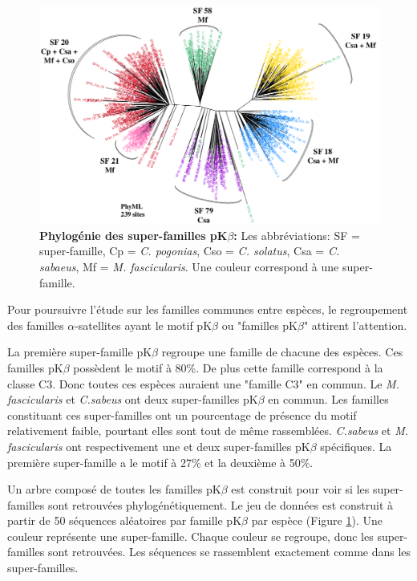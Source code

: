 \documentclass[12pt,a4paper]{article}
\begin{document}
	\begin{figure}	
			\centering
				\includegraphics[scale=0.4]{img/pkb_tree.png}				
				\caption{\textbf{Phylogénie des super-familles pK$\beta$:} Les abbréviations: SF = super-famille, Cp = \textit{C. pogonias}, Cso = \textit{C. solatus}, Csa = \textit{C. sabaeus}, Mf = \textit{M. fascicularis}. Une couleur correspond à une super-famille. 
	\label{fig:pkb_tree}} 
	\end{figure}

	Pour poursuivre l'étude sur les familles communes entre espèces, le regroupement des familles $\alpha$-satellites ayant  le motif pK$\beta$ ou "familles pK$\beta$" attirent l'attention. 
	
	La première super-famille pK$\beta$ regroupe une famille de chacune des espèces. Ces familles pK$\beta$ possèdent le motif à 80\%. De plus cette famille correspond à la classe C3. Donc toutes ces espèces auraient une "famille C3" en commun. Le \textit{M. fascicularis} et \textit{C.sabeus} ont deux super-familles pK$\beta$ en commun. Les familles constituant ces super-familles ont un pourcentage de présence du motif relativement faible, pourtant elles sont tout de même rassemblées.  \textit{C.sabeus} et \textit{M. fascicularis} ont respectivement une et deux super-familles pK$\beta$ spécifiques. La première super-famille a le motif à 27\% et la deuxième à 50\%.
		
	Un arbre composé de toutes les familles pK$\beta$ est construit pour voir si les super-familles sont retrouvées phylogénétiquement. Le jeu de données est construit à partir de 50 séquences aléatoires par famille pK$\beta$ par espèce (Figure \ref{fig:pkb_tree}). Une couleur représente une super-famille. Chaque couleur se regroupe, donc les super-familles sont retrouvées. Les séquences se rassemblent exactement comme dans les super-familles.
	
\end{document}
